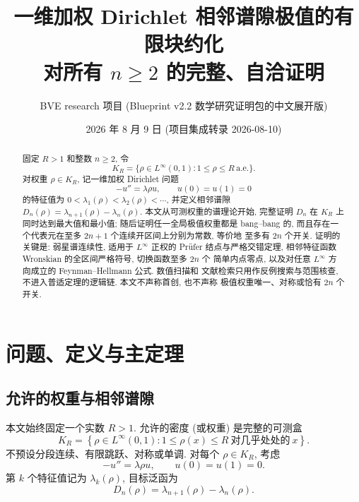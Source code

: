 \documentclass[UTF8]{ctexart}
\title{一维加权 Dirichlet 相邻谱隙极值的有限块约化\\ 对所有 $n\ge2$ 的完整、自洽证明}
\author{BVE research 项目 (Blueprint v2.2 数学研究证明包的中文展开版)}
\date{2026 年 8 月 9 日 (项目集成转录 2026-08-10)}
\begin{document}
\maketitle

\begin{abstract}
固定 $R>1$ 和整数 $n\ge2$, 令
\begin{equation*}
	K_R=\{\rho\in L^\infty(0,1): 1\le\rho\le R\ \text{a.e.}\}.
\end{equation*}
对权重 $\rho\in K_R$, 记一维加权 Dirichlet 问题
\begin{equation*}
	-u''=\lambda\rho u,\qquad u(0)=u(1)=0
\end{equation*}
的特征值为 $0<\lambda_1(\rho)<\lambda_2(\rho)<\cdots$, 并定义相邻谱隙
$D_n(\rho)=\lambda_{n+1}(\rho)-\lambda_n(\rho)$. 本文从可测权重的谱理论开始,
完整证明 $D_n$ 在 $K_R$ 上同时达到最大值和最小值; 随后证明任一全局极值权重都是
bang--bang 的, 而且存在一个代表元在至多 $2n+1$ 个连续开区间上分别为常数, 等价地
至多有 $2n$ 个开关. 证明的关键是: 弱星谱连续性, 适用于 $L^\infty$ 正权的 Pr\"ufer
结点与严格交错定理, 相邻特征函数 Wronskian 的全区间严格符号, 切换函数至多 $2n$ 个
简单内点零点, 以及对任意 $L^\infty$ 方向成立的 Feynman--Hellmann 公式. 数值扫描和
文献检索只用作反例搜索与范围核查, 不进入普适定理的逻辑链. 本文不声称首创, 也不声称
极值权重唯一、对称或恰有 $2n$ 个开关.
\end{abstract}

\tableofcontents

\section{问题、定义与主定理}
\subsection{允许的权重与相邻谱隙}

本文始终固定一个实数 $R>1$. 允许的密度 (或权重) 是完整的可测盒
\begin{equation}
	K_R=\left\{\rho\in L^\infty(0,1): 1\le\rho(x)\le R\ \text{对几乎处处的}\ x\right\}.
\end{equation}
不预设分段连续、有限跳跃、对称或单调. 对每个 $\rho\in K_R$, 考虑
\begin{equation}
	-u''=\lambda\rho u,\qquad u(0)=u(1)=0.
	\label{eq:sl}
\end{equation}
第 $k$ 个特征值记为 $\lambda_k(\rho)$, 目标泛函为
\begin{equation}
	D_n(\rho)=\lambda_{n+1}(\rho)-\lambda_n(\rho).
	\label{eq:dn}
\end{equation}
\end{document}

